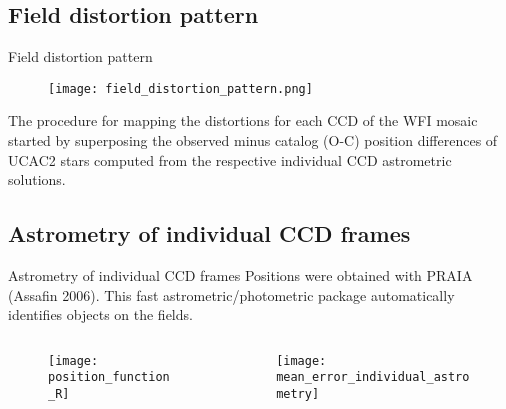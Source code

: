 
\subsection*{Field distortion pattern}
\begin{frame}[c]{Field distortion pattern}

		\begin{figure}[tb]
			\centering
			\texttt{[image: field\_distortion\_pattern.png]}
		\end{figure}

The procedure for mapping the distortions for each CCD of the WFI mosaic started by superposing the observed minus catalog (O-C) position differences of UCAC2 stars computed from the respective individual CCD astrometric solutions.

\end{frame}


\subsection*{Astrometry of individual CCD frames}

\begin{frame}[c]{Astrometry of individual CCD frames}
Positions were obtained with PRAIA (Assafin 2006). This fast astrometric/photometric package automatically identifies objects on the fields.
	\begin{columns}[t]
	\begin{column}[c]{5.5cm}
		\begin{figure}[tb]
			\centering
			\texttt{[image: position\_function\_R]}
		\end{figure}
	\end{column}
	\begin{column}[c]{5.7cm}
		\begin{figure}[tb]
			\centering
			\texttt{[image: mean\_error\_individual\_astrometry]}
		\end{figure}
	\end{column}
	\end{columns}
\end{frame}


